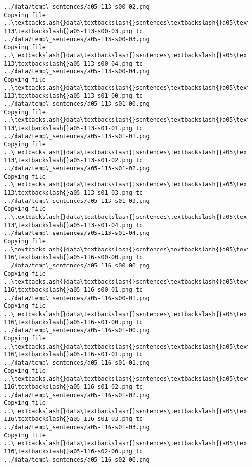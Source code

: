 \documentclass[11pt]{article}
\begin{document}
\begin{Verbatim}[commandchars=\\\{\}]
../data/temp\_sentences/a05-113-s00-02.png
Copying file ..\textbackslash{}data\textbackslash{}sentences\textbackslash{}a05\textbackslash{}a05-113\textbackslash{}a05-113-s00-03.png to
../data/temp\_sentences/a05-113-s00-03.png
Copying file ..\textbackslash{}data\textbackslash{}sentences\textbackslash{}a05\textbackslash{}a05-113\textbackslash{}a05-113-s00-04.png to
../data/temp\_sentences/a05-113-s00-04.png
Copying file ..\textbackslash{}data\textbackslash{}sentences\textbackslash{}a05\textbackslash{}a05-113\textbackslash{}a05-113-s01-00.png to
../data/temp\_sentences/a05-113-s01-00.png
Copying file ..\textbackslash{}data\textbackslash{}sentences\textbackslash{}a05\textbackslash{}a05-113\textbackslash{}a05-113-s01-01.png to
../data/temp\_sentences/a05-113-s01-01.png
Copying file ..\textbackslash{}data\textbackslash{}sentences\textbackslash{}a05\textbackslash{}a05-113\textbackslash{}a05-113-s01-02.png to
../data/temp\_sentences/a05-113-s01-02.png
Copying file ..\textbackslash{}data\textbackslash{}sentences\textbackslash{}a05\textbackslash{}a05-113\textbackslash{}a05-113-s01-03.png to
../data/temp\_sentences/a05-113-s01-03.png
Copying file ..\textbackslash{}data\textbackslash{}sentences\textbackslash{}a05\textbackslash{}a05-113\textbackslash{}a05-113-s01-04.png to
../data/temp\_sentences/a05-113-s01-04.png
Copying file ..\textbackslash{}data\textbackslash{}sentences\textbackslash{}a05\textbackslash{}a05-116\textbackslash{}a05-116-s00-00.png to
../data/temp\_sentences/a05-116-s00-00.png
Copying file ..\textbackslash{}data\textbackslash{}sentences\textbackslash{}a05\textbackslash{}a05-116\textbackslash{}a05-116-s00-01.png to
../data/temp\_sentences/a05-116-s00-01.png
Copying file ..\textbackslash{}data\textbackslash{}sentences\textbackslash{}a05\textbackslash{}a05-116\textbackslash{}a05-116-s01-00.png to
../data/temp\_sentences/a05-116-s01-00.png
Copying file ..\textbackslash{}data\textbackslash{}sentences\textbackslash{}a05\textbackslash{}a05-116\textbackslash{}a05-116-s01-01.png to
../data/temp\_sentences/a05-116-s01-01.png
Copying file ..\textbackslash{}data\textbackslash{}sentences\textbackslash{}a05\textbackslash{}a05-116\textbackslash{}a05-116-s01-02.png to
../data/temp\_sentences/a05-116-s01-02.png
Copying file ..\textbackslash{}data\textbackslash{}sentences\textbackslash{}a05\textbackslash{}a05-116\textbackslash{}a05-116-s01-03.png to
../data/temp\_sentences/a05-116-s01-03.png
Copying file ..\textbackslash{}data\textbackslash{}sentences\textbackslash{}a05\textbackslash{}a05-116\textbackslash{}a05-116-s02-00.png to
../data/temp\_sentences/a05-116-s02-00.png

\end{Verbatim}
\end{document}
